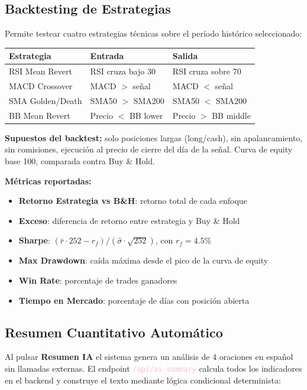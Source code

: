 \documentclass[11pt, a4paper]{article}
\newcommand{\api}[1]{\texttt{\textcolor{pink}{#1}}}
\begin{document}
\subsection{Backtesting de Estrategias}

Permite testear cuatro estrategias técnicas sobre el período histórico seleccionado:

\begin{center}
\begin{tabularx}{\textwidth}{llX}
  \toprule
  \textbf{Estrategia} & \textbf{Entrada} & \textbf{Salida} \\
  \midrule
  RSI Mean Revert  & RSI cruza bajo 30  & RSI cruza sobre 70 \\
  MACD Crossover   & MACD $>$ señal     & MACD $<$ señal \\
  SMA Golden/Death & SMA50 $>$ SMA200   & SMA50 $<$ SMA200 \\
  BB Mean Revert   & Precio $<$ BB lower & Precio $>$ BB middle \\
  \bottomrule
\end{tabularx}
\end{center}

\textbf{Supuestos del backtest:} solo posiciones largas (long/cash), sin apalancamiento, sin comisiones, ejecución al precio de cierre del día de la señal. Curva de equity base 100, comparada contra Buy \& Hold.

\textbf{Métricas reportadas:}
\begin{itemize}
  \item \textbf{Retorno Estrategia vs B\&H}: retorno total de cada enfoque
  \item \textbf{Exceso}: diferencia de retorno entre estrategia y Buy \& Hold
  \item \textbf{Sharpe}: $(\bar{r} \cdot 252 - r_f) / (\hat{\sigma} \cdot \sqrt{252})$, con $r_f = 4.5\%$
  \item \textbf{Max Drawdown}: caída máxima desde el pico de la curva de equity
  \item \textbf{Win Rate}: porcentaje de trades ganadores
  \item \textbf{Tiempo en Mercado}: porcentaje de días con posición abierta
\end{itemize}

\subsection{Resumen Cuantitativo Automático}

Al pulsar \textbf{Resumen IA} el sistema genera un análisis de 4 oraciones en español sin llamadas externas. El endpoint \api{/api/ai\_summary} calcula todos los indicadores en el backend y construye el texto mediante lógica condicional determinista:
\end{document}
